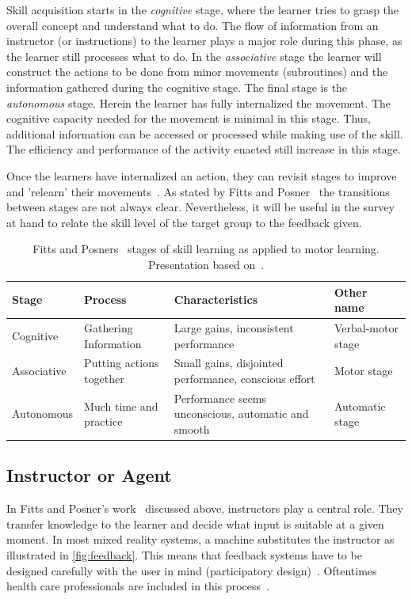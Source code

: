 Skill acquisition starts in the \emph{cognitive} stage, where the learner tries to grasp the overall concept and understand what to do. The flow of information from an instructor (or instructions) to the learner plays a major role during this phase, as the learner still processes what to do. 
In the \emph{associative} stage the learner will construct the actions to be done from minor movements (subroutines) and the information gathered during the cognitive stage.
The final stage is the \emph{autonomous} stage. Herein the learner has fully internalized the movement. The cognitive capacity needed for the movement is minimal in this stage. Thus, additional information can be accessed or processed while making use of the skill. The efficiency and performance of the activity enacted still increase in this stage.

Once the learners have internalized an action, they can revisit stages to improve and 'relearn' their movements~\cite{huber2013AEP}. As stated by Fitts and Posner~\cite{fitts1967HPe} the transitions between stages are not always clear. Nevertheless, it will be useful in the survey at hand to relate the skill level of the target group to the feedback given.

\begin{table}[ht]
\caption{Fitts and Posners~\cite{fitts1967HPe} stages of skill learning as applied to motor learning. Presentation based on~\cite{huber2013AEP}.\label{table:1}}
\begin{tabular}{ |p{2.2cm}||p{2.6cm}|p{5.2cm}|p{2.2cm}|  }
    
 \hline
 Stage & Process & Characteristics & Other name\\
 \hline
 \hline
 Cognitive & \raggedright Gathering Information & \raggedright Large gains, inconsistent performance & Verbal-motor stage \\
 \hline
 Associative & \raggedright  Putting actions together & \raggedright Small gains, disjointed performance, conscious effort & Motor stage \\
 \hline
 Autonomous & Much time and practice & Performance seems unconscious, automatic and smooth & Automatic stage \\
 \hline
\end{tabular}
\label{table:stages}
\end{table}

\subsection{Instructor or Agent\label{sec:instructor}}
In Fitts and Posner's work~\cite{fitts1967HPe} discussed above, instructors play a central role. They transfer knowledge to the learner and decide what input is suitable at a given moment. In most mixed reality systems, a machine substitutes the instructor as illustrated in \autoref{fig:feedback}. This means that feedback systems have to be designed carefully with the user in mind (participatory design)~\cite{davies2003vrf}. Oftentimes health care professionals are included in this process~\cite{hilton2011dem}.

